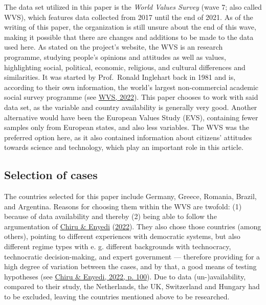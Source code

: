 \documentclass[
  12pt,
  english,
]{article}
\begin{document}
The data set utilized in this paper is the \emph{World Values Survey}
(wave 7; also called WVS), which features data collected from 2017 until
the end of 2021. As of the writing of this paper, the organization is
still unsure about the end of this wave, making it possible that there
are changes and additions to be made to the data used here. As stated on
the project's website, the WVS is an research programme, studying
people's opinions and attitudes as well as values, highlighting social,
political, economic, religious, and cultural differences and
similarities. It was started by Prof.~Ronald Inglehart back in 1981 and
is, according to their own information, the world's largest
non-commercial academic social survey programme (see
\protect\hyperlink{ref-wvs2022info}{WVS, 2022}). This paper chooses to
work with said data set, as the variable and country availability is
generally very good. Another alternative would have been the European
Values Study (EVS), containing fewer samples only from European states,
and also less variables. The WVS was the preferred option here, as it
also contained information about citizens' attitudes towards science and
technology, which play an important role in this article.

\hypertarget{selection-of-cases}{%
\subsection{Selection of cases}\label{selection-of-cases}}

The countries selected for this paper include Germany, Greece, Romania,
Brazil, and Argentina. Reasons for choosing them within the WVS are
twofold: (1) because of data availability and thereby (2) being able to
follow the argumentation of \protect\hyperlink{ref-chiru2022wants}{Chiru
\& Enyedi} (\protect\hyperlink{ref-chiru2022wants}{2022}). They also
chose those countries (among others), pointing to different experiences
with democratic systems, but also different regime types with e. g.
different backgrounds with technocracy, technocratic decision-making,
and expert government --- therefore providing for a high degree of
variation between the cases, and by that, a good means of testing
hypotheses (see \protect\hyperlink{ref-chiru2022wants}{Chiru \& Enyedi,
2022, p. 100}). Due to data (un-)availability, compared to their study,
the Netherlands, the UK, Switzerland and Hungary had to be excluded,
leaving the countries mentioned above to be researched.
\end{document}
